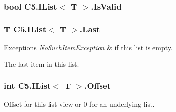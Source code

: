\hypertarget{interface_c5_1_1_i_list_ade26b03c600c09845c51fa9c36b24f15}{}
\subsubsection[{Is\+Valid}]{\setlength{\rightskip}{0pt plus 5cm}bool {\bf C5.\+I\+List}$<$ T $>$.Is\+Valid\hspace{0.3cm}{\ttfamily [get]}}\label{interface_c5_1_1_i_list_ade26b03c600c09845c51fa9c36b24f15}




\hypertarget{interface_c5_1_1_i_list_a7544fb96e486622500dc684352eac27b}{}
\subsubsection[{Last}]{\setlength{\rightskip}{0pt plus 5cm}T {\bf C5.\+I\+List}$<$ T $>$.Last\hspace{0.3cm}{\ttfamily [get]}}\label{interface_c5_1_1_i_list_a7544fb96e486622500dc684352eac27b}





\begin{DoxyExceptions}{Exceptions}
{\em \hyperlink{class_c5_1_1_no_such_item_exception}{No\+Such\+Item\+Exception}} & if this list is empty.\\
\hline
\end{DoxyExceptions}


The last item in this list.\hypertarget{interface_c5_1_1_i_list_a018e889717be028a6190964c98e10c63}{}
\subsubsection[{Offset}]{\setlength{\rightskip}{0pt plus 5cm}int {\bf C5.\+I\+List}$<$ T $>$.Offset\hspace{0.3cm}{\ttfamily [get]}}\label{interface_c5_1_1_i_list_a018e889717be028a6190964c98e10c63}




Offset for this list view or 0 for an underlying list.\hypertarget{interface_c5_1_1_i_list_a93fa9e99864a05d47bcc6a5e4bf7feb9}{}
